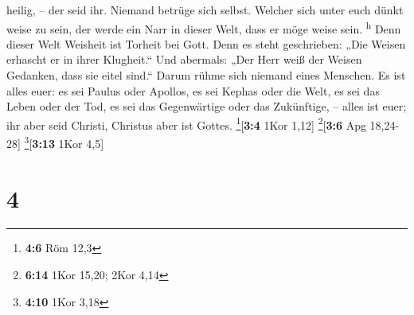heilig, -- der seid ihr.  Niemand betrüge sich selbst.
Welcher sich unter euch dünkt weise zu sein, der werde ein Narr in
dieser Welt, dass er möge weise sein. \textsuperscript{h}
 Denn dieser Welt Weisheit ist Torheit bei Gott. Denn es
steht geschrieben: „Die Weisen erhascht er in ihrer Klugheit.``
 Und abermals: „Der Herr weiß der Weisen Gedanken, dass
sie eitel sind.``  Darum rühme sich niemand eines
Menschen. Es ist alles euer:  es sei Paulus oder Apollos,
es sei Kephas oder die Welt, es sei das Leben oder der Tod, es sei das
Gegenwärtige oder das Zukünftige, -- alles ist euer;  ihr
aber seid Christi, Christus aber ist Gottes. \footnote{\textbf{4:6} Röm
  12,3}{[}\textbf{3:4} 1Kor 1,12{]} \footnote{\textbf{6:14} 1Kor 15,20;
  2Kor 4,14}{[}\textbf{3:6} Apg 18,24-28{]} \footnote{\textbf{4:10} 1Kor
  3,18}{[}\textbf{3:13} 1Kor 4,5{]}

\hypertarget{section-3}{%
\section{4}\label{section-3}}

